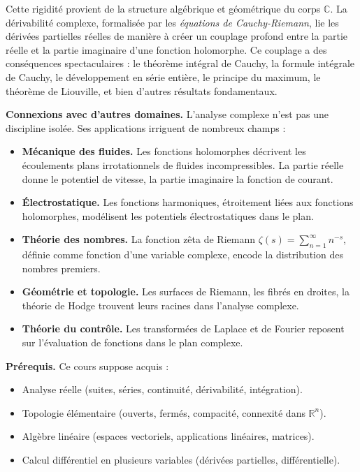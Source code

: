 \documentclass[12pt,a4paper,openany]{book}
\theoremstyle{definition}
\theoremstyle{plain}
\theoremstyle{remark}
\newcommand{\C}{\mathbb{C}}
\newcommand{\R}{\mathbb{R}}
\begin{document}
Cette rigidité provient de la structure algébrique et géométrique du corps $\C$. La dérivabilité complexe, formalisée par les \emph{équations de Cauchy-Riemann}, lie les dérivées partielles réelles de manière à créer un couplage profond entre la partie réelle et la partie imaginaire d'une fonction holomorphe. Ce couplage a des conséquences spectaculaires : le théorème intégral de Cauchy, la formule intégrale de Cauchy, le développement en série entière, le principe du maximum, le théorème de Liouville, et bien d'autres résultats fondamentaux.

\medskip

\noindent\textbf{Connexions avec d'autres domaines.}
L'analyse complexe n'est pas une discipline isolée. Ses applications irriguent de nombreux champs :
\begin{itemize}[leftmargin=2cm]
  \item \textbf{Mécanique des fluides.} Les fonctions holomorphes décrivent les écoulements plans irrotationnels de fluides incompressibles. La partie réelle donne le potentiel de vitesse, la partie imaginaire la fonction de courant.
  \item \textbf{Électrostatique.} Les fonctions harmoniques, étroitement liées aux fonctions holomorphes, modélisent les potentiels électrostatiques dans le plan.
  \item \textbf{Théorie des nombres.} La fonction zêta de Riemann $\zeta(s) = \sum_{n=1}^{\infty} n^{-s}$, définie comme fonction d'une variable complexe, encode la distribution des nombres premiers.
  \item \textbf{Géométrie et topologie.} Les surfaces de Riemann, les fibrés en droites, la théorie de Hodge trouvent leurs racines dans l'analyse complexe.
  \item \textbf{Théorie du contrôle.} Les transformées de Laplace et de Fourier reposent sur l'évaluation de fonctions dans le plan complexe.
\end{itemize}

\medskip

\noindent\textbf{Prérequis.}
Ce cours suppose acquis :
\begin{itemize}[leftmargin=2cm]
  \item Analyse réelle (suites, séries, continuité, dérivabilité, intégration).
  \item Topologie élémentaire (ouverts, fermés, compacité, connexité dans $\R^n$).
  \item Algèbre linéaire (espaces vectoriels, applications linéaires, matrices).
  \item Calcul différentiel en plusieurs variables (dérivées partielles, différentielle).
\end{itemize}
\end{document}
